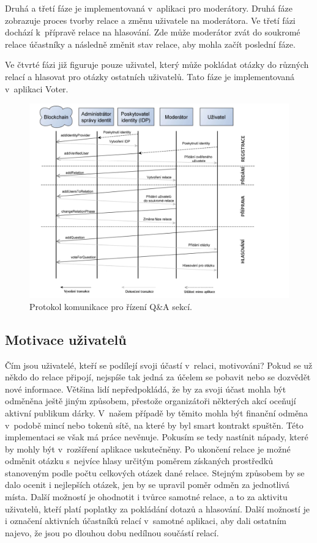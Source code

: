 Druhá a třetí fáze je implementovaná v~aplikaci pro moderátory. Druhá fáze zobrazuje proces tvorby relace a změnu uživatele na moderátora. Ve třetí fázi dochází k~přípravě relace na hlasování. Zde může moderátor zvát do soukromé relace účastníky a následně změnit stav relace, aby mohla začít poslední fáze. 

Ve čtvrté fázi již figuruje pouze uživatel, který může pokládat otázky do různých relací a hlasovat pro otázky ostatních uživatelů. Tato fáze je implementovaná v~aplikaci Voter.

\begin{figure}
\centering
\includegraphics[width=\linewidth]{obrazky/protokol_sipky.png}
\caption{Protokol komunikace pro řízení Q\&A sekcí.}
\label{fig:protokol}
\end{figure}
\subsection*{Motivace uživatelů}
Čím jsou uživatelé, kteří se podílejí svoji účastí v~relaci, motivováni? Pokud se už někdo do relace připojí, nejspíše tak jedná za účelem se pobavit nebo se dozvědět nové informace. Většina lidí nepředpokládá, že by za svoji účast mohla být odměněna ještě jiným způsobem, přestože organizátoři některých akcí oceňují aktivní publikum dárky. V~našem případě by těmito  mohla být finanční odměna v~podobě mincí nebo tokenů sítě, na které by byl smart kontrakt spuštěn. Této implementaci se však má práce nevěnuje. Pokusím se tedy nastínit nápady, které by mohly být v~rozšíření aplikace uskutečněny. Po ukončení relace je možné odměnit otázku s~nejvíce hlasy určitým poměrem získaných prostředků stanoveným podle počtu celkových otázek dané relace. Stejným způsobem by se dalo ocenit i nejlepších  otázek, jen by se upravil poměr odměn za jednotlivá místa. Další možností je ohodnotit i tvůrce samotné relace, a to za aktivitu uživatelů, kteří platí poplatky za pokládání dotazů a hlasování. Další možností je i označení aktivních účastníků relací v~samotné aplikaci, aby dali ostatním najevo, že jsou po dlouhou dobu nedílnou součástí relací.  


